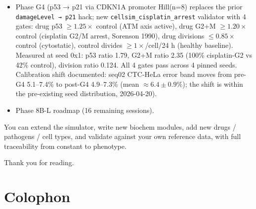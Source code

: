 \documentclass[11pt,letterpaper,twoside,openany]{book}
\newcommand{\code}[1]{\texttt{#1}}
\begin{document}
\begin{itemize}
        raw \code{damageLevel} to the real \code{p53\_protein} pool
        via \code{linMap}$(0.12, 0.35)$; p53 pulses now drive the
        existing 11-trigger apoptosis cascade through PUMA $\to$ BAX
        $\to$ MOMP $\to$ caspase commitment;
        \texttt{cellsim\_cisplatin\_apoptosis} validator with 5 gates:
        control PUMA $\leq 1.0$,
        cisplatin PUMA $\geq 3.0$,
        PUMA ratio drug/ctl $\geq 5\times$,
        engine p53\_active $\geq 0.55$,
        Bax ratio drug/ctl $\geq 1.3\times$.
        Measured at damage 0.35 (physiologic cisplatin-equivalent),
        seed 0x1: PUMA ratio $20.7\times$, Bax ratio $1.79\times$,
        engine p53\_active 0.746.
        All 5 gates pass across 5 pinned seeds.
        Scope footer: the cell-kill execution step is gated by
        XIAP/Smac balance in the pre-existing cascade (caspase-3 stays
        at $\approx 0.04$ under saturated MOMP); that calibration is
        its own PR and does not change G5's commitment-signature claim.
        Zero seq02 drift, 2026-04-20).
  \item Phase G4 (p53 → p21 via CDKN1A promoter Hill(n=8) replaces
        the prior \texttt{damageLevel → p21} hack; new
        \texttt{cellsim\_cisplatin\_arrest} validator with 4 gates:
        drug p53 $\geq 1.25\times$ control (ATM axis active),
        drug G2+M $\geq 1.20\times$ control (cisplatin G2/M arrest,
        Sorenson 1990),
        drug divisions $\leq 0.85\times$ control (cytostatic),
        control divides $\geq 1\times$/cell/24 h (healthy baseline).
        Measured at seed 0x1: p53 ratio 1.79, G2+M ratio 2.35 (100\%
        cisplatin-G2 vs 42\% control), division ratio 0.124.
        All 4 gates pass across 4 pinned seeds.
        Calibration shift documented: seq02 CTC-HeLa error band
        moves from pre-G4 5.1--7.4\% to post-G4 4.9--7.3\%
        (mean $\approx 6.4 \pm 0.9\%$); the shift is within the
        pre-existing seed distribution, 2026-04-20).
  \item Phase 8B-L roadmap (16 remaining sessions).
\end{itemize}

You can extend the simulator, write new biochem modules, add new
drugs / pathogens / cell types, and validate against your own
reference data, with full traceability from constant to phenotype.

Thank you for reading.

\chapter{Colophon}
\label{ch:colophon}
\end{document}
